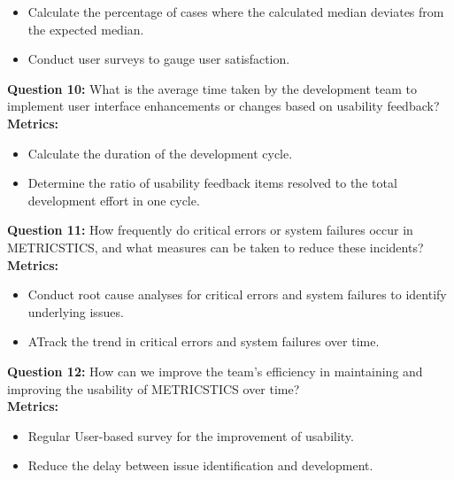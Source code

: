 \begin{itemize}
    \item Calculate the percentage of cases where the calculated median deviates from the expected median.
    \item Conduct user surveys to gauge user satisfaction.
\end{itemize}
\vspace{10pt}
\textbf{Question 10:} What is the average time taken by the development team to implement user interface enhancements or changes based on usability feedback? \\
\textbf{Metrics:}
\begin{itemize}
    \item Calculate the duration of the development cycle.
    \item Determine the ratio of usability feedback items resolved to the total development effort in one cycle.
\\
\end{itemize}
\vspace{10pt}
\textbf{Question 11:} How frequently do critical errors or system failures occur in METRICSTICS, and what measures can be taken to reduce these incidents?  \\
\textbf{Metrics:}
\begin{itemize}
    \item Conduct root cause analyses for critical errors and system failures to identify underlying issues.
    \item ATrack the trend in critical errors and system failures over time.
 \\
\end{itemize}
\vspace{10pt}
\textbf{Question 12:} How can we improve the team’s efficiency in maintaining and improving the usability of METRICSTICS over time? \\
\textbf{Metrics:}
\begin{itemize}
    \item Regular User-based survey for the improvement of usability.
    \item Reduce the delay between issue identification and development. \\
\vspace{10pt}
\vspace{100pt}
\end{itemize}


